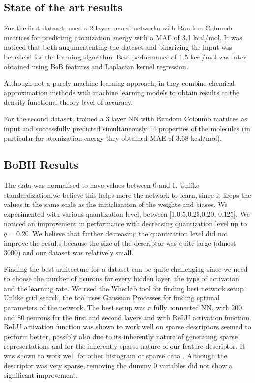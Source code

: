 \documentclass{article}
\begin{document}
\subsection{State of the art results}
For the first dataset,  \cite{montavon2012learning} used a 2-layer neural networks with Random Coloumb matrices for predicting atomization energy with a MAE of 3.1 kcal/mol.
It was noticed that both augumententing the dataset and binarizing the input was beneficial for the learning algorithm. Best performance of 1.5 kcal/mol was later obtained using BoB\citep{bob} features and Laplacian kernel regression.

Although not a purely machine learning approach, in \cite{falsebigdata} they combine chemical approximation methods with machine learning models to obtain results at the density functional theory level of accuracy.

For the second dataset,\cite{montavon2012learning} trained a 3 layer NN with Random Coloumb matrices as input and successfully predicted simultaneously 14 properties of the molecules (in particular for atomization energy they obtained MAE of 3.68 kcal/mol).


\subsection{BoBH Results}
The data was normalised to have values between 0 and 1. Unlike standardization,we believe this helps more the network to learn, since it keeps the values in the same scale as the initialization of the weights and biases.
We experimented with various quantization level, between [1.0.5,0.25,0.20, 0.125]. We noticed an improvement in performance with decreasing quantization level up to  $q=0.20$. We believe that further decreasing the quantization level did not improve the results because the size of the descriptor was quite large (almost 3000) and our dataset was relatively small. 

Finding the best arhitecture for a dataset can be quite challenging since we need to choose the number of neurons for every hidden layer, the type of activation and the learning rate.
We used the Whetlab tool for finding best network setup \cite{whetlab} . Unlike grid search, the tool uses Gaussian Processes for finding optimal parameters of the network.
The best setup was a fully connected NN, with 200 and 80 neurons for the first and second layers and with ReLU activation function. 
ReLU activation function was shown to work well on sparse descriptors seemed to perform better, possibly also due to its inherently nature of generating sparse representations and for the inherently sparse nature of our feature descriptor. It was shown to work well for other histogram or sparse data \cite{relu}. Although the descriptor was very sparse, removing the dummy 0 variables did not show a significant improvement.
\end{document}
